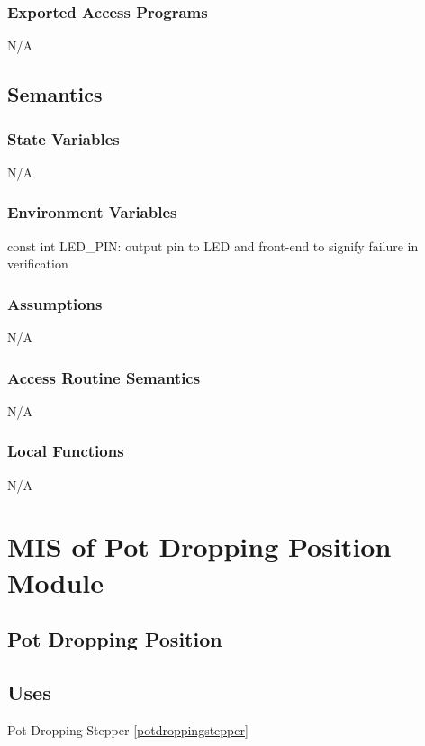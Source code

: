 \documentclass[12pt, titlepage]{article}
\begin{document}
\subsubsection{Exported Access Programs}

N/A

\subsection{Semantics}

\subsubsection{State Variables}

N/A

\subsubsection{Environment Variables}

const int LED\_PIN: output pin to LED and front-end to signify failure in verification\\

\subsubsection{Assumptions}

N/A
\subsubsection{Access Routine Semantics}

N/A

\subsubsection{Local Functions}

N/A

\section{MIS of Pot Dropping Position Module} \label{potDroppingPosition} 

\subsection{Pot Dropping Position}

\subsection{Uses}
Pot Dropping Stepper \ref{potdroppingstepper}
\end{document}
